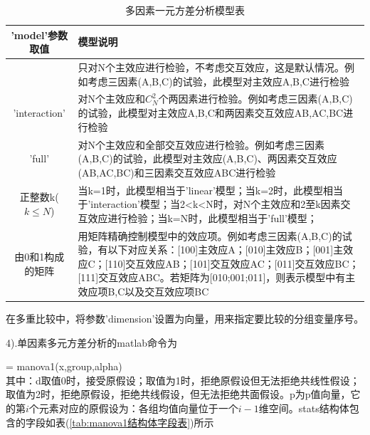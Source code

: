         \begin{table}[H]
        \caption{多因素一元方差分析模型表}
        \label{tab:多因素一元方差分析模型表}
        \begin{tabularx}{\textwidth}{|c|X|}%
        \toprule
         'model'参数取值& 模型说明\\\midrule
         & 只对N个主效应进行检验，不考虑交互效应，这是默认情况。例如考虑三因素(A,B,C)的试验，此模型对主效应A,B,C进行检验\\\hline
        {'interaction'}  & 对N个主效应和$C_N^2$个两因素进行检验。例如考虑三因素(A,B,C)的试验，此模型对主效应A,B,C和两因素交互效应AB,AC,BC进行检验\\\hline
        {'full'}  & 对N个主效应和全部交互效应进行检验。例如考虑三因素(A,B,C)的试验，此模型对主效应(A,B,C)、两因素交互效应(AB,AC,BC)和三因素交互效应ABC进行检验\\\hline
        {正整数k($k\le N$)} &当k=1时，此模型相当于'linear'模型；当k=2时，此模型相当于'interaction'模型；当2<k<N时，对N个主效应和2至k因素交互效应进行检验；当k=N时，此模型相当于'full'模型；\\\hline
        {由0和1构成的矩阵} & 用矩阵精确控制模型中的效应项。例如考虑三因素(A,B,C)的试验，有以下对应关系：[100]主效应A；[010]主效应B；[001]主效应C；[110]交互效应AB；[101]交互效应AC；[011]交互效应BC；[111]交互效应ABC。若矩阵为[010;001;011]，则表示模型中有主效应项B,C以及交互效应项BC\\
        \bottomrule
        \end{tabularx}
        \end{table}
        在多重比较中，将参数'dimension'设置为向量，用来指定要比较的分组变量序号。
        \par
        4).单因素多元方差分析的matlab命令为
        \par
        [d,p,stats] = manova1(x,group,alpha)\\
        其中：d取值0时，接受原假设；取值为1时，拒绝原假设但无法拒绝共线性假设；取值为2时，拒绝原假设，拒绝共线假设，但无法拒绝共面假设。p为p值向量，它的第$i$个元素对应的原假设为：各组均值向量位于一个$i-1$维空间。stats结构体包含的字段如表(\ref{tab:manova1结构体字段表})所示
